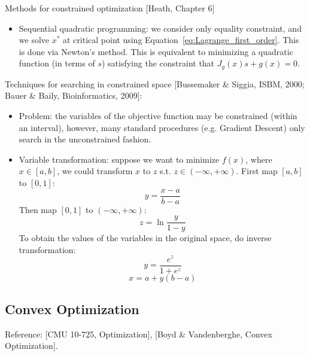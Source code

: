 \documentclass{report}
\begin{document}
Methods for constrained optimization [Heath, Chapter 6]
\begin{itemize}
	\item Sequential quadratic programming: we consider only equality constraint, and we solve $x^*$ at critical point using Equation~\ref{eq:Lagrange_first_order}. This is done via Newton's method. This is equivalent to minimizing a quadratic function (in terms of $s$) satisfying the constraint that $J_g(x) s + g(x) = 0$. 
\end{itemize}

Techniques for searching in constrained space [Bussemaker \& Siggia, ISBM, 2000; Bauer \& Baily, Bioinformatics, 2009]:
\begin{itemize}
\item Problem: the variables of the objective function may be constrained (within an interval), however, many standard procedures (e.g. Gradient Descent) only search in the unconstrained fashion. 

\item Variable transformation: suppose we want to minimize $f(x)$, where $x \in [a,b]$, we could transform $x$ to $z$ s.t. $z \in (-\infty, +\infty)$. First map $[a,b]$ to $[0,1]$:  
\begin{equation}
y = \frac{x-a}{b-a}	
\end{equation}
Then map $[0,1]$ to $(-\infty, +\infty)$: 
\begin{equation}
z = \ln \frac{y}{1-y}
\end{equation}
To obtain the values of the variables in the original space, do inverse transformation: 
\begin{equation}
y = \frac{e^z}{1+e^z}	
\end{equation}
\begin{equation}
x = a + y(b-a)
\end{equation}
\end{itemize}

\subsection{Convex Optimization}

Reference: [CMU 10-725, Optimization], [Boyd \& Vandenberghe, Convex Optimization].
\end{document}
